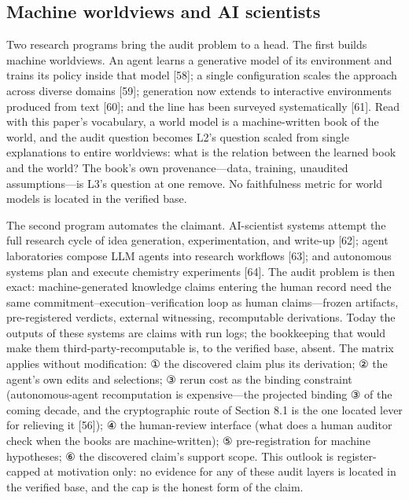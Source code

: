 \documentclass[11pt]{article}
\begin{document}
\subsection{Machine worldviews and AI scientists}
\noindent Two research programs bring the audit problem to a head. The first builds machine worldviews. An agent learns a generative model of its environment and trains its policy inside that model [58]; a single configuration scales the approach across diverse domains [59]; generation now extends to interactive environments produced from text [60]; and the line has been surveyed systematically [61]. Read with this paper's vocabulary, a world model is a machine-written book of the world, and the audit question becomes L2's question scaled from single explanations to entire worldviews: what is the relation between the learned book and the world? The book's own provenance—data, training, unaudited assumptions—is L3's question at one remove. No faithfulness metric for world models is located in the verified base.\par
\noindent The second program automates the claimant. AI-scientist systems attempt the full research cycle of idea generation, experimentation, and write-up [62]; agent laboratories compose LLM agents into research workflows [63]; and autonomous systems plan and execute chemistry experiments [64]. The audit problem is then exact: machine-generated knowledge claims entering the human record need the same commitment–execution–verification loop as human claims—frozen artifacts, pre-registered verdicts, external witnessing, recomputable derivations. Today the outputs of these systems are claims with run logs; the bookkeeping that would make them third-party-recomputable is, to the verified base, absent. The matrix applies without modification: ① the discovered claim plus its derivation; ② the agent's own edits and selections; ③ rerun cost as the binding constraint (autonomous-agent recomputation is expensive—the projected binding ③ of the coming decade, and the cryptographic route of Section 8.1 is the one located lever for relieving it [56]); ④ the human-review interface (what does a human auditor check when the books are machine-written); ⑤ pre-registration for machine hypotheses; ⑥ the discovered claim's support scope. This outlook is register-capped at motivation only: no evidence for any of these audit layers is located in the verified base, and the cap is the honest form of the claim.\par
\end{document}
